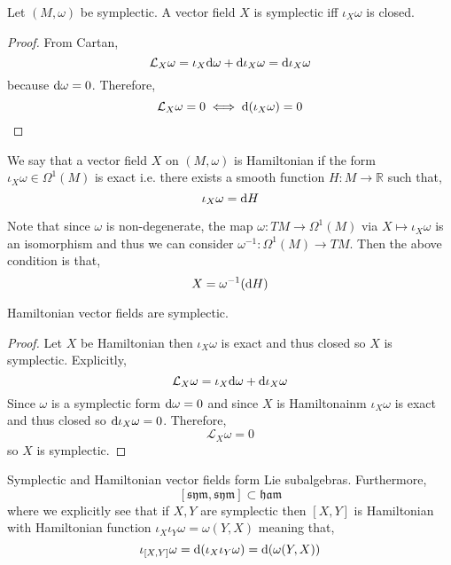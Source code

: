 \documentclass[12pt]{extarticle}
\renewcommand{\L}{\mathcal{L}}
\newcommand{\R}{\mathbb{R}}
\begin{document}
\begin{lemma}
Let $(M, \omega)$ be symplectic. A vector field $X$ is symplectic iff $\iota_X \omega$ is closed.
\end{lemma}

\begin{proof}
From Cartan,
\[ \L_X \omega = \iota_X \d{\omega} + \d \iota_X \omega = \d \iota_X \omega \]
because $\mathrm{d}{\omega} = 0$. Therefore,
\[ \L_X \omega = 0 \iff \d{(\iota_X \omega)} = 0 \]
\end{proof}

\begin{definition}
We say that a vector field $X$ on $(M, \omega)$ is Hamiltonian if the form $\iota_X \omega \in \Omega^1(M)$ is exact i.e. there exists a smooth function $H : M \to \R$ such that,
\[ \iota_X \omega = \mathrm{d}{H} \]
\end{definition}

\begin{remark}
Note that since $\omega$ is non-degenerate, the map $\omega : TM \to \Omega^1(M)$ via $X \mapsto \iota_X \omega$ is an isomorphism and thus we can consider $\omega^{-1} : \Omega^1(M) \to TM$. Then the above condition is that,
\[ X = \omega^{-1}(\mathrm{d}{H}) \] 
\end{remark}

\begin{lemma}
Hamiltonian vector fields are symplectic.
\end{lemma}

\begin{proof}
Let $X$ be Hamiltonian then $\iota_X \omega$ is exact and thus closed so $X$ is symplectic. Explicitly,
\[ \L_X \omega = \iota_X \d \omega + \d \iota_X \omega \]
Since $\omega$ is a symplectic form $\mathrm{d}{\omega} = 0$ and since $X$ is Hamiltonainm $\iota_X \omega$ is exact and thus closed so $\mathrm{d} \iota_X \omega = 0$. Therefore,
\[ \L_X \omega = 0 \]
so $X$ is symplectic. 
\end{proof}

\newcommand{\sym}{\mathfrak{sym}}

\newcommand{\ham}{\mathfrak{ham}}

\begin{lemma}
Symplectic and Hamiltonian vector fields form Lie subalgebras. Furthermore, 
\[ [ \sym, \sym ] \subset \ham \]
where we explicitly see that if $X, Y$ are symplectic then $[X, Y]$ is Hamiltonian with Hamiltonian function $\iota_X \iota_Y \omega = \omega(Y, X)$ meaning that,
\[ \iota_{[X, Y]} \omega = \mathrm{d}{(\iota_X \iota_Y \omega)} = \mathrm{d}(\omega(Y, X)) \] 
\end{lemma}
\end{document}
